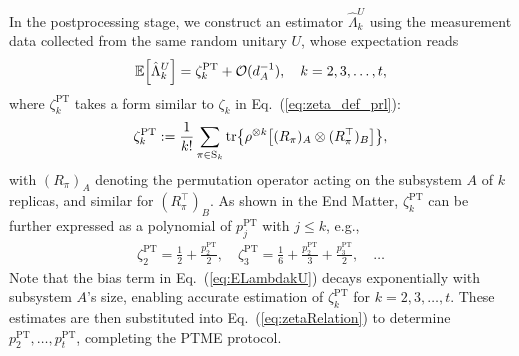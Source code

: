 \documentclass[aps,prl,twocolumn,nofootinbib,superscriptaddress,10pt]{revtex4-2}
\let\originalleft\left
\let\originalright\right
\renewcommand{\left}{\mathopen{}\mathclose\bgroup\originalleft}
\renewcommand{\right}{\aftergroup\egroup\originalright}
\DeclareMathOperator{\Tr}{tr}
\theoremstyle{plain}
\theoremstyle{definition}
\newcommand{\PT}{\mathrm{PT}}
\newcommand{\eref}[1]{Eq.~\textup{(\ref{#1})}}
\begin{document}



In the postprocessing stage, we construct an estimator $\hat{\Lambda}_k^{U}$ using the measurement data collected from the same random unitary $U$, whose expectation reads \cite{SM}
\begin{align}\label{eq:ELambdakU}
	\mathbb{E}\left[ \hat{\Lambda}_k^{U} \right]
	= \zeta_k^{\PT} + \mathcal{O}(d_A^{-1}), \quad k=2,3,\dots,t,  
\end{align}
where $\zeta_k^{\PT}$ takes a form similar to $\zeta_k$ in \eref{eq:zeta_def_prl}:
\begin{equation}
	\zeta_k^{\PT}
    := \frac{1}{k!}\sum_{\pi\in \mathrm{S}_k}
	\Tr\left\{\rho^{\otimes k} \left[(R_\pi)_A \otimes (R_\pi^{\top})_B\right]\right\},  
\end{equation}
with $(R_\pi)_A$ denoting the permutation operator acting on the subsystem $A$ of $k$ replicas, and similar for $(R_\pi^{\top})_B$. 
As shown in the End Matter, $\zeta_k^{\PT}$ can be further expressed as 
a polynomial of $p_j^{\PT}$ with $j\le k$, e.g., 
\begin{align}\label{eq:zetaRelation}
\zeta_2^{\PT}= \frac{1}{2}+\frac{p_2^{\PT}}{2}, \quad  
\zeta_3^{\PT}= \frac{1}{6}+\frac{p_2^{\PT}}{3}+\frac{p_3^{\PT}}{2}, \quad  \dots 
\end{align}
Note that the bias term in \eref{eq:ELambdakU} decays exponentially with subsystem $A$'s size, enabling accurate estimation of $\zeta_k^{\PT}$ for $k=2,3,\dots,t$. These estimates are then substituted into \eref{eq:zetaRelation} to determine $p_2^{\PT},\dots,p_t^{\PT}$, completing the PTME protocol. 
\fi
\end{document}
